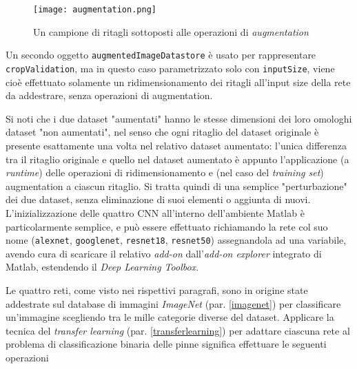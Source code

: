 \begin{figure}[h!]
  \centering
  \texttt{[image: augmentation.png]}
  \caption{Un campione di ritagli sottoposti alle operazioni di \textit{augmentation}}
  \label{fig:augmentation}
\end{figure}

Un secondo oggetto \verb|augmentedImageDatastore| è usato per rappresentare \verb|cropValidation|, ma in questo caso parametrizzato solo con \verb|inputSize|, viene cioè effettuato solamente un ridimensionamento dei ritagli all'input size della rete da addestrare, senza operazioni di augmentation.

Si noti che i due dataset "aumentati" hanno le stesse dimensioni dei loro omologhi dataset "non aumentati", nel senso che ogni ritaglio del dataset originale è presente esattamente una volta nel relativo dataset aumentato: l'unica differenza tra il ritaglio originale e quello nel dataset aumentato è appunto l'applicazione (a \textit{runtime}) delle operazioni di ridimensionamento e (nel caso del \textit{training set}) augmentation a ciascun ritaglio. Si tratta quindi di una semplice "perturbazione" dei due dataset, senza eliminazione di suoi elementi o aggiunta di nuovi.\\

L'inizializzazione delle quattro CNN all'interno dell'ambiente Matlab è particolarmente semplice, e può essere effettuato richiamando la rete col suo nome (\verb|alexnet|, \verb|googlenet|, \verb|resnet18|, \verb|resnet50|) assegnandola ad una variabile, avendo cura di scaricare il relativo \textit{add-on} dall'\textit{add-on explorer} integrato di Matlab, estendendo il \textit{Deep Learning Toolbox}.

Le quattro reti, come visto nei rispettivi paragrafi, sono in origine state addestrate sul database di immagini \textit{ImageNet} (par. \ref{imagenet}) per classificare un'immagine scegliendo tra le mille categorie diverse del dataset. Applicare la tecnica del \textit{transfer learning} (par. \ref{transferlearning}) per adattare ciascuna rete al problema di classificazione binaria delle pinne significa effettuare le seguenti operazioni

